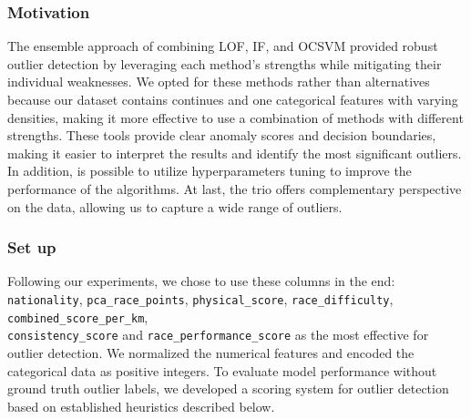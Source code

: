\documentclass[a4paper, twoside]{article}
\begin{document}
\subsubsection{Motivation}
The ensemble approach of combining LOF, IF, and OCSVM provided robust outlier detection by leveraging each method's strengths while mitigating their individual weaknesses. We opted for these methods rather than alternatives because our dataset contains continues and one categorical features with varying densities, making it more effective to use a combination of methods with different strengths.
These tools provide clear anomaly scores and decision boundaries, making it easier to interpret the results and identify the most significant outliers. In addition, is possible to utilize hyperparameters tuning to improve the performance of the algorithms.
At last, the trio offers complementary perspective on the data, allowing us to capture a wide range of outliers.

\subsubsection{Set up}
Following our experiments, we chose to use these columns in the end: \texttt{nationality}, \texttt{pca\_race\_points}, \texttt{physical\_score}, \texttt{race\_difficulty}, \texttt{combined\_score\_per\_km}, \\ \texttt{consistency\_score} and \texttt{race\_performance\_score} as the most effective for outlier detection. We normalized the numerical features and encoded the categorical data as positive integers.
To evaluate model performance without ground truth outlier labels, we developed a scoring system for outlier detection based on established heuristics described below.
\end{document}
